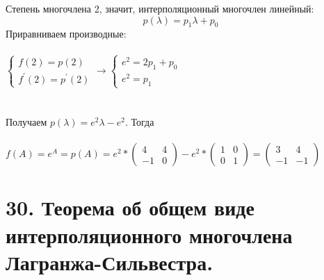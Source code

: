 \documentclass[14pt]{extarticle}
\begin{document}
  Степень многочлена 2, значит, интерполяционный многочлен линейный:
  $$ p(\lambda) = p_1\lambda + p_0 $$
  Приравниваем производные: \\\\
  $\begin{cases}
    f(2) = p(2)\\
    f^{'}(2) = p^{'}(2)
  \end{cases} \rightarrow 
  \begin{cases}
    e^2 = 2p_1 + p_0\\
    e^2 = p_1
  \end{cases}$\\\\\\
  Получаем $ p(\lambda) = e^2\lambda - e^2 $. Тогда \\\\
  $f(A) = e^A = p(A) = e^2 * \begin{pmatrix}
    4 & 4\\ 
    -1 & 0
  \end{pmatrix} - e^2 * \begin{pmatrix}
    1 & 0\\ 
    0 & 1
  \end{pmatrix} = \begin{pmatrix}
    3 & 4\\ 
    -1 & -1
  \end{pmatrix}$

\section{30.	
    Теорема об общем виде интерполяционного многочлена Лагранжа-Сильвестра.
}
\end{document}
